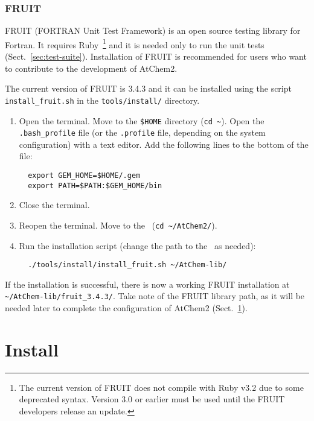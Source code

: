 \subsubsection{FRUIT}

FRUIT (FORTRAN Unit Test Framework) is an open source testing library
for Fortran. It requires Ruby~\footnote{The current version of FRUIT
  does not compile with Ruby v3.2 due to some deprecated
  syntax. Version 3.0 or earlier must be used until the FRUIT
  developers release an update.} and it is needed only to run the unit
tests (Sect.~\ref{sec:test-suite}). Installation of FRUIT is
recommended for users who want to contribute to the development of
AtChem2.

The current version of FRUIT is 3.4.3 and it can be installed using
the script \texttt{install\_fruit.sh} in the \texttt{tools/install/}
directory.

\begin{enumerate}
\item Open the terminal. Move to the \texttt{\$HOME} directory
  (\texttt{cd\ \textasciitilde}). Open the \texttt{.bash\_profile}
  file (or the \texttt{.profile} file, depending on the system
  configuration) with a text editor. Add the following lines to the
  bottom of the file:
  \begin{verbatim}
  export GEM_HOME=$HOME/.gem
  export PATH=$PATH:$GEM_HOME/bin
  \end{verbatim}
\item Close the terminal.
\item Reopen the terminal. Move to the \maindir\ (\verb|cd ~/AtChem2/|).
\item Run the installation script (change the path to the \depdir\ as
  needed):
  \begin{verbatim}
  ./tools/install/install_fruit.sh ~/AtChem-lib/
  \end{verbatim}
\end{enumerate}

If the installation is successful, there is now a working FRUIT
installation at \texttt{\textasciitilde/AtChem-lib/fruit\_3.4.3/}.
Take note of the FRUIT library path, as it will be needed later to
complete the configuration of AtChem2 (Sect.~\ref{sec:install}).


\section{Install} \label{sec:install}

